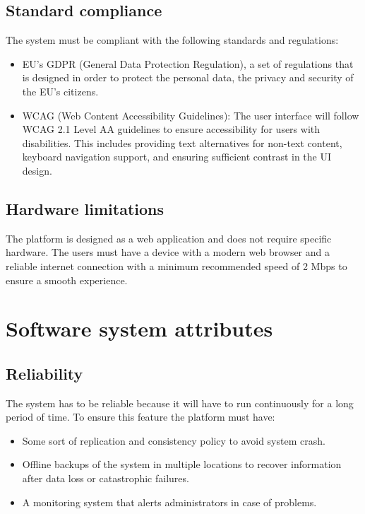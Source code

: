 \subsection{Standard compliance}
\label{subsec:standard compliance}%
The system must be compliant with the following standards and regulations:
\begin{itemize}
    \item EU's GDPR (General Data Protection Regulation), a set of regulations that is designed in order to protect the personal data, the privacy and security of the EU's citizens.
    \item WCAG (Web Content Accessibility Guidelines): The user interface will follow WCAG 2.1 Level AA guidelines to ensure accessibility for users with disabilities. This includes providing text alternatives for non-text content, keyboard navigation support, and ensuring sufficient contrast in the UI design.
\end{itemize}

\subsection{Hardware limitations}
\label{subsec:hardware_limitations}%
The platform is designed as a web application and does not require specific hardware. The users must have a device with a modern web browser and a reliable internet connection with a minimum recommended speed of 2 Mbps to ensure a smooth experience.

\section{Software system attributes}
\label{sec:software_system_attributes}%

\subsection{Reliability}
\label{subsec:reliability}%
The system has to be reliable because it will have to run continuously for a long period
of time. To ensure this feature the platform must have:
\begin{itemize}
    \item Some sort of replication and consistency policy to avoid system crash.
    \item Offline backups of the system in multiple locations to recover information after data loss or catastrophic failures.
    \item A monitoring system that alerts administrators in case of problems.
\end{itemize}

